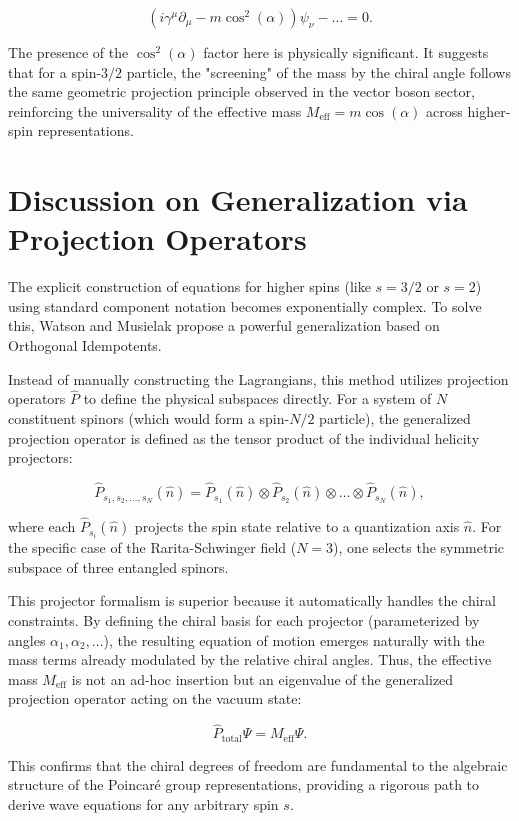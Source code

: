 \begin{equation}
    (i \gamma^\mu \partial_\mu - m \cos^2(\alpha)) \psi_\nu - \dots = 0.
\end{equation}

The presence of the $\cos^2(\alpha)$ factor here is physically significant. It suggests that for a spin-$3/2$ particle, the "screening" of the mass by the chiral angle follows the same geometric projection principle observed in the vector boson sector, reinforcing the universality of the effective mass $M_{\text{eff}} = m \cos(\alpha)$ across higher-spin representations.

\section*{Discussion on Generalization via Projection Operators}

The explicit construction of equations for higher spins (like $s=3/2$ or $s=2$) using standard component notation becomes exponentially complex. To solve this, Watson and Musielak propose a powerful generalization based on Orthogonal Idempotents.

Instead of manually constructing the Lagrangians, this method utilizes projection operators $\hat{P}$ to define the physical subspaces directly. For a system of $N$ constituent spinors (which would form a spin-$N/2$ particle), the generalized projection operator is defined as the tensor product of the individual helicity projectors:

\begin{equation}
    \hat{P}_{s_1, s_2, \dots, s_N}(\hat{n}) = \hat{P}_{s_1}(\hat{n}) \otimes \hat{P}_{s_2}(\hat{n}) \otimes \dots \otimes \hat{P}_{s_N}(\hat{n}),
\end{equation}

where each $\hat{P}_{s_i}(\hat{n})$ projects the spin state relative to a quantization axis $\hat{n}$. For the specific case of the Rarita-Schwinger field ($N=3$), one selects the symmetric subspace of three entangled spinors.

This projector formalism is superior because it automatically handles the chiral constraints. By defining the chiral basis for each projector (parameterized by angles $\alpha_1, \alpha_2, \dots$), the resulting equation of motion emerges naturally with the mass terms already modulated by the relative chiral angles. Thus, the effective mass $M_{\text{eff}}$ is not an ad-hoc insertion but an eigenvalue of the generalized projection operator acting on the vacuum state:

\begin{equation}
    \hat{P}_{\text{total}} \Psi = M_{\text{eff}} \Psi.
\end{equation}

This confirms that the chiral degrees of freedom are fundamental to the algebraic structure of the Poincaré group representations, providing a rigorous path to derive wave equations for any arbitrary spin $s$.
